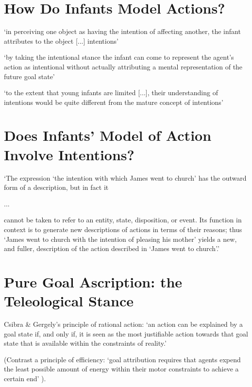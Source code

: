 \documentclass[12pt]{extarticle}
\begin{document}
\begin{multicols}{3}
 
 
\section{How Do Infants Model Actions?}
 
‘in perceiving one object as having the intention of affecting another, the infant attributes to the object [...] intentions’
\citep[p.\ 14]{Premack:1990jl}
 
‘by taking the intentional stance the infant can come to represent the agent’s action as intentional without actually attributing a mental representation of the future goal state’
\citep[p.\ 188]{Gergely:1995sq}
 
‘to the extent that young infants are limited [...], their understanding of intentions would be quite different from the mature concept of intentions’
\citep[p.\ 168]{woodward:2001_making}
 
 
 
\section{Does Infants’ Model of Action Involve Intentions?}
 
`The expression `the intention with which James went to church' has the outward form of a description, but in fact it
 
...\ %
 
cannot be taken to refer to an entity, state, disposition, or event. Its function in context is to generate new descriptions of actions in terms of their reasons; thus `James went to church with the intention of pleasing his mother' yields a new, and fuller, description of the action described in `James went to church'.'
\citep[p.\ 690]{davidson:1963_orig}
 
 
 
\section{Pure Goal Ascription: the Teleological Stance}
 
Csibra \& Gergely's principle of rational action: `an action can be explained by a goal state if, and only if, it is seen as the most justifiable action towards that goal state that is available within the constraints of reality.'\citep{Csibra:1998cx,Csibra:2003jv}
 
(Contrast a principle of efficiency: `goal attribution requires that agents expend the least possible amount of energy within their motor constraints to achieve a certain end' \citep[p.\ 1061]{Southgate:2008el}).
 

\end{multicols}
\end{document}
